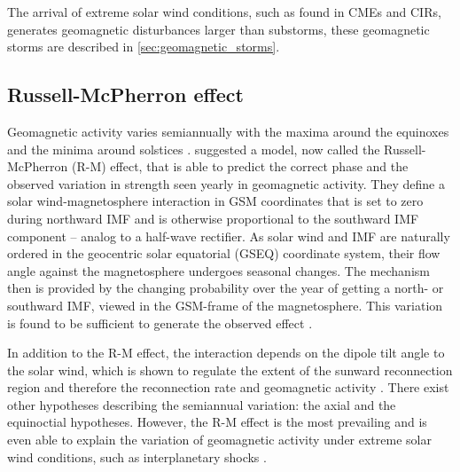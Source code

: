 The arrival of extreme solar wind conditions, such as found in CMEs and CIRs, generates geomagnetic disturbances larger than substorms, these geomagnetic storms are described in \autoref{sec:geomagnetic_storms}.


\subsection{Russell-McPherron effect}
\label{sec:russell_mcpherron_effect}
Geomagnetic activity varies semiannually with the maxima around the equinoxes and the minima around solstices \citep{Cortie1912}. \citet{Russell1973} suggested a model, now called the Russell-McPherron (R-M) effect, that is able to predict the correct phase and the observed variation in strength seen yearly in geomagnetic activity. They define a solar wind-magnetosphere interaction in GSM coordinates that is set to zero during northward IMF and is otherwise proportional to the southward IMF component -- analog to a half-wave rectifier. As solar wind and IMF are naturally ordered in the geocentric solar equatorial (GSEQ) coordinate system, their flow angle against the magnetosphere undergoes seasonal changes. The mechanism then is provided by the changing probability over the year of getting a north- or southward IMF, viewed in the GSM-frame of the magnetosphere. This variation is found to be sufficient to generate the observed effect \citep{Russell1973}.

In addition to the R-M effect, the interaction depends on the dipole tilt angle to the solar wind, which is shown to regulate the extent of the sunward reconnection region and therefore the reconnection rate and geomagnetic activity \citep{Russell2003}. There exist other hypotheses describing the semiannual variation: the axial and the equinoctial hypotheses. However, the R-M effect is the most prevailing and is even able to explain the variation of geomagnetic activity under extreme solar wind conditions, such as interplanetary shocks \citep{Zhao2012}.


